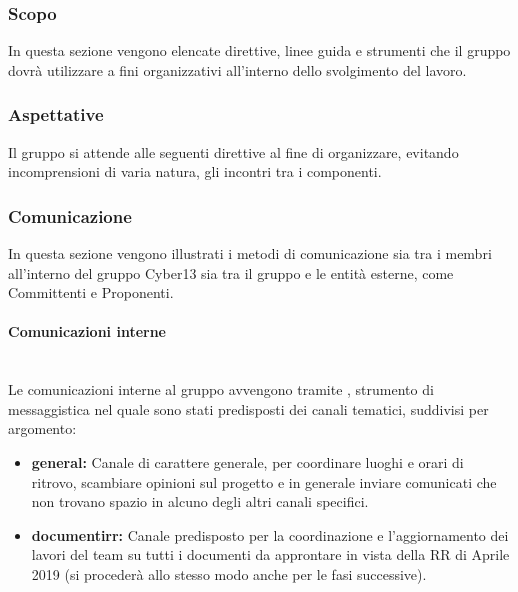 \subsubsection{Scopo}
In questa sezione vengono elencate direttive, linee guida e strumenti che il gruppo dovrà utilizzare a fini organizzativi all'interno dello svolgimento del lavoro.
\subsubsection{Aspettative}
Il gruppo si attende alle seguenti direttive al fine di organizzare, evitando incomprensioni di varia natura, gli incontri tra i componenti.



\subsubsection{Comunicazione}
In questa sezione vengono illustrati i metodi di comunicazione sia tra i membri all'interno del gruppo Cyber13 sia tra il gruppo e le entità esterne, come Committenti e Proponenti.
    \paragraph{Comunicazioni interne}
    ~\\Le comunicazioni interne al gruppo avvengono tramite , strumento di messaggistica nel quale sono stati predisposti dei canali tematici, suddivisi per argomento:
    \begin{itemize}
    \item \textbf{general:} Canale di carattere generale, per coordinare luoghi e orari di ritrovo, scambiare opinioni sul progetto e in generale inviare comunicati che non trovano spazio in alcuno degli altri canali specifici.
    \item \textbf{documentirr:} Canale predisposto per la coordinazione e l'aggiornamento dei lavori del team su tutti i documenti da approntare in vista della RR di Aprile 2019 (si procederà allo stesso modo anche per le fasi successive).
    
    \end{itemize}
